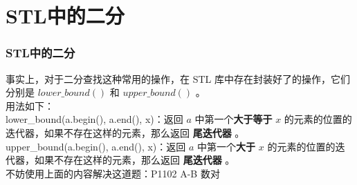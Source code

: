 \documentclass{beamer}
\newcommand{\fdf}[1]{\alert{\textbf{#1}}}
\begin{document}
\section{STL中的二分}
\begin{frame}
\frametitle{STL中的二分}
事实上，对于二分查找这种常用的操作，在 STL 库中存在封装好了的操作，它们分别是 $lower\_bound()$ 和 $upper\_bound()$ 。\\ 
用法如下：\\
lower\_bound(a.begin(), a.end(), x)：返回 $a$ 中第一个\fdf{大于等于} $x$ 的元素的位置的迭代器，如果不存在这样的元素，那么返回 \fdf{尾迭代器} 。	 \\
upper\_bound(a.begin(), a.end(), x)：返回 $a$ 中第一个\fdf{大于} $x$ 的元素的位置的迭代器，如果不存在这样的元素，那么返回 \fdf{尾迭代器} 。\\
不妨使用上面的内容解决这道题：P1102 A-B 数对
\end{frame}
\end{document}
